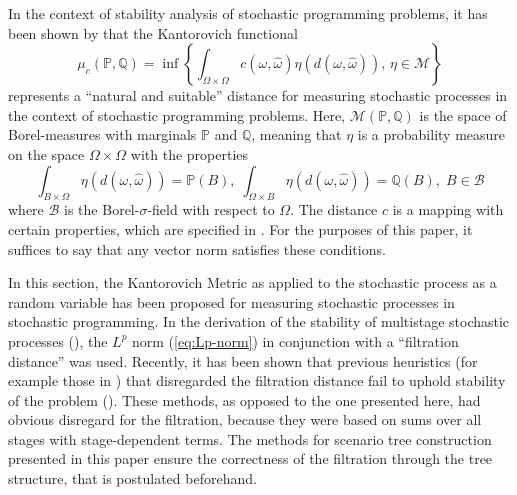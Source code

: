 In the context of stability analysis of stochastic programming problems, it has been shown by \cite{Dupacova2003} that the Kantorovich functional
\begin{equation}
  \label{eq:define-infinitedim-kantorovich}
  \mu_c(\mathbb{P}, \mathbb{Q}) = \inf\left\{\int_{\Omega\times\Omega}c(\omega, \hat{\omega})\eta(d(\omega,\hat{\omega})),\, \eta\in\mathcal{M}\right\}
\end{equation}
represents a  ``natural and suitable''\cite{Dupacova2003} distance for measuring stochastic processes in the context of stochastic programming problems. 
Here, $\mathcal{M}(\mathbb{P, Q})$ is the space of Borel-measures with marginals $\mathbb{P}$ and $\mathbb{Q}$, meaning that $\eta$ is a probability measure on the space $\Omega\times\Omega$ with the properties
\begin{equation}
  \label{eq:define-borel-measures}
  \int_{B\times \Omega} \eta(d(\omega,\hat{\omega})) = \mathbb{P}(B),\;   \int_{\Omega\times B} \eta(d(\omega,\hat{\omega})) = \mathbb{Q}(B),\; B \in \mathcal{B}
\end{equation}
where $\mathcal{B}$ is the Borel-$\sigma$-field with respect to $\Omega$.
The distance $c$ is a mapping with certain properties, which are specified in \cite{Dupacova2003}.
For the purposes of this paper, it suffices to say that any vector norm satisfies these conditions.

\begin{Note}
  In this section, the Kantorovich Metric as applied to the stochastic process as a random variable has been proposed for measuring stochastic processes in stochastic programming.
  In the derivation of the stability of multistage stochastic processes (\cite{Heitsch2010}), the $L^p$ norm (\ref{eq:Lp-norm}) in conjunction with a ``filtration distance'' was used.
  Recently, it has been shown that previous heuristics (for example those in \cite{Dupacova2003}) that disregarded the filtration distance fail to uphold stability of the problem (\cite{Heitsch2009a}).
  These methods, as opposed to the one presented here, had obvious disregard for the filtration, because they were based on sums over all stages with stage-dependent terms.
  The methods for scenario tree construction presented in this paper ensure the correctness of the filtration through the tree structure, that is postulated beforehand.
\end{Note}
